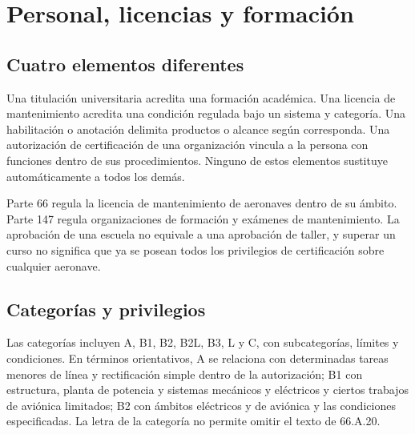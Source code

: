 \chapter{Personal, licencias y formación}\label{ch:19}
\section{Cuatro elementos diferentes}
Una titulación universitaria acredita una formación académica. Una licencia de mantenimiento acredita una condición regulada bajo un sistema y categoría. Una habilitación o anotación delimita productos o alcance según corresponda. Una autorización de certificación de una organización vincula a la persona con funciones dentro de sus procedimientos. Ninguno de estos elementos sustituye automáticamente a todos los demás.

Parte 66 regula la licencia de mantenimiento de aeronaves dentro de su ámbito. Parte 147 regula organizaciones de formación y exámenes de mantenimiento. La aprobación de una escuela no equivale a una aprobación de taller, y superar un curso no significa que ya se posean todos los privilegios de certificación sobre cualquier aeronave.
\section{Categorías y privilegios}
Las categorías incluyen A, B1, B2, B2L, B3, L y C, con subcategorías, límites y condiciones. En términos orientativos, A se relaciona con determinadas tareas menores de línea y rectificación simple dentro de la autorización; B1 con estructura, planta de potencia y sistemas mecánicos y eléctricos y ciertos trabajos de aviónica limitados; B2 con ámbitos eléctricos y de aviónica y las condiciones especificadas. La letra de la categoría no permite omitir el texto de 66.A.20.

